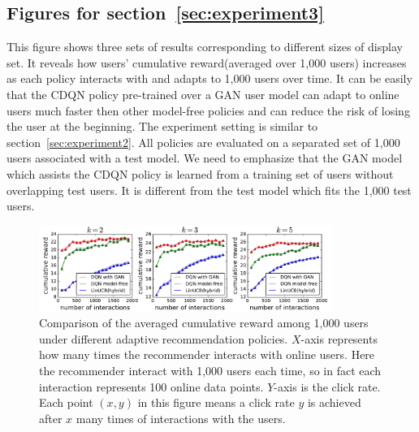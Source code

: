 \documentclass{article} %
\begin{document}
\subsection{Figures for section~\ref{sec:experiment3}}\label{app:exp_policy3}
This figure shows three sets of results corresponding to different sizes of display set. It reveals how users' cumulative reward(averaged over 1,000 users) increases as each policy interacts with and adapts to 1,000 users over time. It can be easily that the CDQN policy pre-trained over a {\small GAN} user model can adapt to online users much faster then other model-free policies and can reduce the risk of losing the user at the beginning. The experiment setting is similar to section~\ref{sec:experiment2}. All policies are evaluated on a separated set of 1,000 users associated with a test model. We need to emphasize that the {\small GAN} model which assists the CDQN policy is learned from a training set of users without overlapping test users. It is different from the test model which fits the 1,000 test users. 
\begin{figure}[htbp]
    \centering
    \includegraphics[width=0.85\textwidth]{Figs/policy_compare3_rwd.pdf}
\caption{\small Comparison of the averaged cumulative reward among 1,000 users under different adaptive recommendation policies. $X$-axis represents how many times the recommender interacts with online users. Here the recommender interact with 1,000 users each time, so in fact each interaction represents 100 online data points. $Y$-axis is the click rate. Each point $(x,y)$ in this figure means a click rate $y$ is achieved after $x$ many times of interactions with the users. }
\end{figure}
\end{document}
